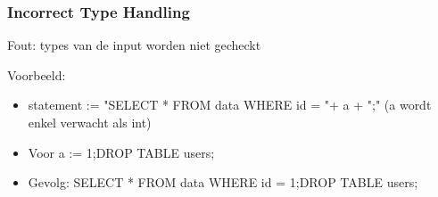 \subsubsection{Incorrect Type Handling}

Fout: types van de input worden niet gecheckt

Voorbeeld:
\begin{itemize}
\item statement := "SELECT * FROM data WHERE id = "+ a + ";" (a wordt enkel verwacht als int)
\item Voor a := 1;DROP TABLE users;
\item Gevolg: SELECT * FROM data WHERE id = 1;DROP TABLE users;
\end{itemize}
